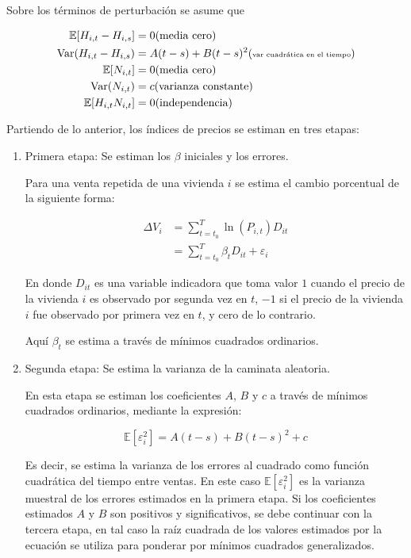 \documentclass[conference]{IEEEtran}
\begin{document}
Sobre los términos de perturbación se asume que 

\begin{align*}
  \mathbb{E}[H_{i,t} - H_{i, s}] &= 0 (\text{media cero}) \\
  \text{Var}(H_{i,t} - H_{i, s}) &= A(t-s) + B(t-s)^2 (\tiny\text{var cuadrática en el tiempo})\\
  \mathbb{E}[N_{i, t}] &= 0 (\text{media cero})\\
  \text{Var}(N_{i, t}) &= c (\text{varianza constante})\\
  \mathbb{E}[H_{i,t}N_{i, t}] &= 0 (\text{independencia})
\end{align*}

Partiendo de lo anterior, los índices de precios se estiman en tres etapas:

\begin{enumerate}
  \item Primera etapa: Se estiman los $\beta$ iniciales y los errores.
  
  Para una venta repetida de una vivienda $i$ se estima el cambio porcentual de la siguiente forma:

  \begin{align*}
    \Delta V_i &= \sum_{t=t_0}^{T} \ln(P_{i,t}) D_{it}\\
    &= \sum_{t=t_0}^{T} \beta_t D_{it} + \varepsilon_{i}
  \end{align*}

  En donde $D_{it}$ es una variable indicadora que toma valor 
  $1$ cuando el precio de la vivienda $i$ es
  observado por segunda vez en $t$, $-1$ si el precio de la vivienda $i$ fue observado por primera
  vez en $t$, y cero de lo contrario. 

  Aquí $\beta_t$ se estima a través de mínimos cuadrados ordinarios.

  \item Segunda etapa: Se estima la varianza de la caminata aleatoria.
  
  En esta etapa se estiman los coeficientes $A$, $B$ y $c$ a través de mínimos cuadrados ordinarios,
  mediante la expresión:

  \[ \mathbb{E}[\varepsilon_i^2] = A(t-s) + B(t-s)^2 + c \]

  Es decir, se estima la varianza de los errores al cuadrado como función cuadrática del tiempo entre ventas.
  En este caso $\mathbb{E}[\varepsilon_i^2]$ es la varianza muestral de los errores estimados en la primera etapa.
  Si los coeficientes estimados $A$ y $B$ son positivos y significativos, se debe continuar con la tercera etapa, 
  en tal caso la raíz cuadrada de los valores estimados por la ecuación se utiliza para ponderar por mínimos cuadrados generalizados.


\end{enumerate}
\end{document}
